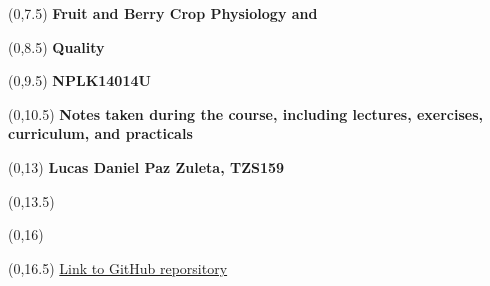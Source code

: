 \begin{titlepage}

    
    \begin{textblock}{9.4}(0,7.5)
        \Huge{\selectfont\bfseries{Fruit and Berry Crop Physiology and }}
    \end{textblock}
    \begin{textblock}{9.4}(0,8.5)
        \Huge{\selectfont\bfseries{Quality}}
    \end{textblock}
    \begin{textblock}{9.4}(0,9.5)
        \Huge{\selectfont\bfseries{NPLK14014U}}
    \end{textblock}
    
    \begin{textblock}{9.4}(0,10.5)
        \LARGE{\selectfont\bfseries{Notes taken during the course, including lectures, exercises, curriculum, and practicals}}
    \end{textblock}
    
    \begin{textblock}{9.4}(0,13)
        \large{\selectfont\bfseries{
        Lucas Daniel Paz Zuleta, TZS159}}
    \end{textblock}
    
    \begin{textblock}{9.4}(0,13.5)
        \large{\selectfont{MSc student at the University of Copenhagen}}
    \end{textblock}
    
    \begin{textblock}{9.4}(0,16)
        \large{\selectfont{Last compiled: \today}}
    \end{textblock}
    
    \begin{textblock}{8.4}(0,16.5)
        \large{\href{https://github.com/DanishUnicorn/tcp}{Link to GitHub reporsitory}}
    \end{textblock}
    

\end{titlepage}

